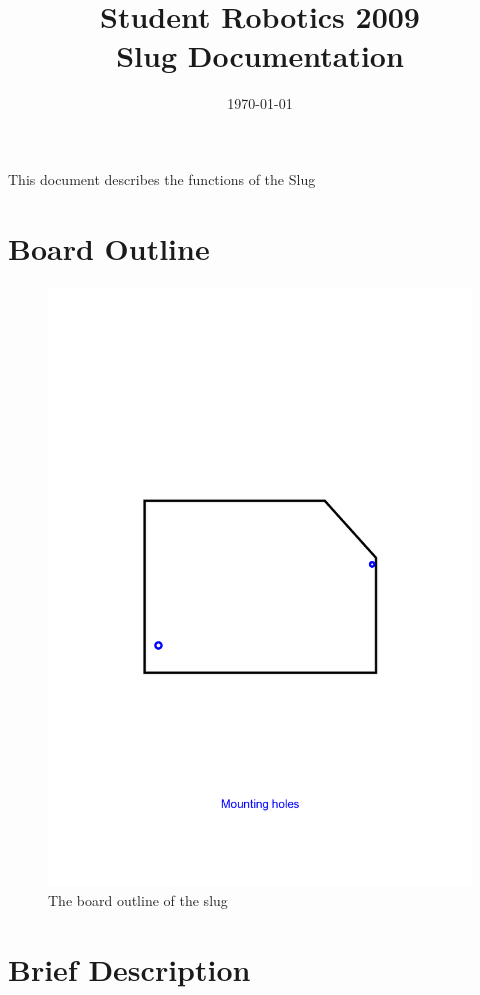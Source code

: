 \documentclass[a4paper, 12pt]{article}
\title {Student Robotics 2009\\ Slug Documentation}
\date{\today}
\begin{document}
\maketitle

\noindent This document describes the functions of the Slug

\section{Board Outline}

\begin{figure}[ht]
\begin{center}
\includegraphics[keepaspectratio, width=12cm]{./images/outline.png}
\caption{\label{slug-outline}The board outline of the slug}
\end{center}
\end{figure}

\section{Brief Description}
\end{document}
